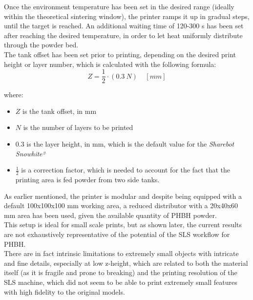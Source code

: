 \documentclass[a4paper]{article}
\begin{document}
          Once the environment temperature has been set in the desired range (ideally within the theoretical 
          sintering window), the printer ramps it up in gradual steps, until the target is reached.  
          An additional waiting time of 120-300 s has been set after reaching the desired temperature, in order to let heat 
          uniformly distribute through the powder bed. \\
  
          The tank offset has been set prior to printing, depending on the desired print height or 
          layer number, which is calculated with the following formula: \\
          
          \begin{equation}
              Z =  \frac{1}{2} \cdot (0.3 \  N) \ \ \ \ \  [mm]
              \label{eq:layer_height}
          \end{equation}
          
          
          where:
          \begin{itemize}
              \item $Z$ is the tank offset, in mm
              \item $N$ is the number of layers to be printed 
              \item $0.3$ is the layer height, in mm, which is the default value for the \textit{Sharebot Snowhite²}
              \item $\frac{1}{2}$ is a correction factor, which is needed to account for the fact that the printing area is fed powder 
              from two side tanks.
          \end{itemize}

          As earlier mentioned, the printer is modular and despite being equipped 
          with a default 100x100x100 mm working area, a reduced distributor with a 20x40x60 mm area has been used, 
          given the available quantity of PHBH powder. \\ 
  
          This setup is ideal for small scale prints, but as shown later, the current results 
          are not exhaustively representative of the potential of the SLS workflow for PHBH. \\
  
          There are in fact intrinsic limitations to extremely small objects with intricate and fine details,
          especially at low z-height, which are related to both the material itself (as it is fragile and prone to 
          breaking) and the printing resolution of the SLS machine, which 
          did not seem to be able to print extremely small features with high fidelity to the original models. \\
  
\end{document}
